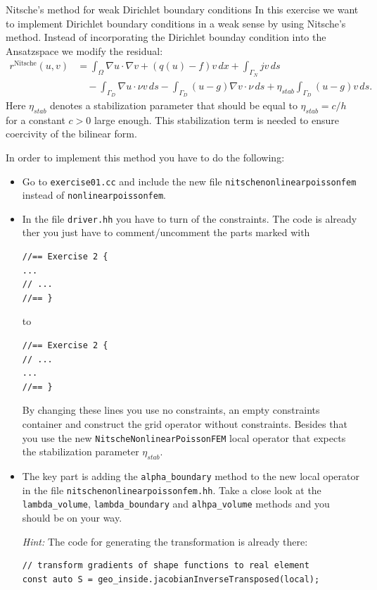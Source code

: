 \documentclass[12pt,a4paper]{article}
\begin{document}
\begin{Exercise}{Nitsche's method for weak Dirichlet boundary
    conditions}
  In this exercise we want to implement Dirichlet boundary conditions
  in a weak sense by using Nitsche's method.  Instead of
  incorporating the Dirichlet bounday condition into the Ansatzspace
  we modify the residual:
  \begin{align*}
    r^{\text{Nitsche}}(u,v) &= \int_\Omega \nabla u \cdot \nabla v + (q(u)-f)v\,dx + \int_{\Gamma_N} jv\,ds \\
    &\quad - \int_{\Gamma_D} \nabla u \cdot\nu v\,ds - \int_{\Gamma_D} (u-g)\nabla v \cdot\nu\,ds
    + \eta_{stab} \int_{\Gamma_D} (u-g)v\,ds.
  \end{align*}
  Here $\eta_{stab}$ denotes a stabilization parameter that should be
  equal to $\eta_{stab}=c/h$ for a constant $c>0$ large enough.  This
  stabilization term is needed to ensure coercivity of the bilinear
  form.

  In order to implement this method you have to do the following:
  \begin{itemize}
  \item Go to \lstinline{exercise01.cc} and include the new file
    \lstinline{nitschenonlinearpoissonfem} instead of
    \lstinline{nonlinearpoissonfem}.
  \item In the file \lstinline{driver.hh} you have to turn of the
    constraints.  The code is already ther you just have to
    comment/uncomment the parts marked with
    \begin{lstlisting}
//== Exercise 2 {
...
// ...
//== }
    \end{lstlisting}
    to
    \begin{lstlisting}
//== Exercise 2 {
// ...
...
//== }
    \end{lstlisting}
    By changing these lines you use no constraints, an empty
    constraints container and construct the grid operator without
    constraints.  Besides that you use the new
    \lstinline{NitscheNonlinearPoissonFEM} local operator that expects
    the stabilization parameter $\eta_{stab}$.
  \item The key part is adding the \lstinline{alpha_boundary} method
    to the new local operator in the file
    \lstinline{nitschenonlinearpoissonfem.hh}.  Take a close look at
    the \lstinline{lambda_volume}, \lstinline{lambda_boundary} and
    \lstinline{alhpa_volume} methods and you should be on your way.

    \emph{Hint:} The code for generating the transformation
    is already there:
    \begin{lstlisting}
// transform gradients of shape functions to real element
const auto S = geo_inside.jacobianInverseTransposed(local);
    \end{lstlisting}


\end{itemize}
\end{Exercise}
\end{document}
